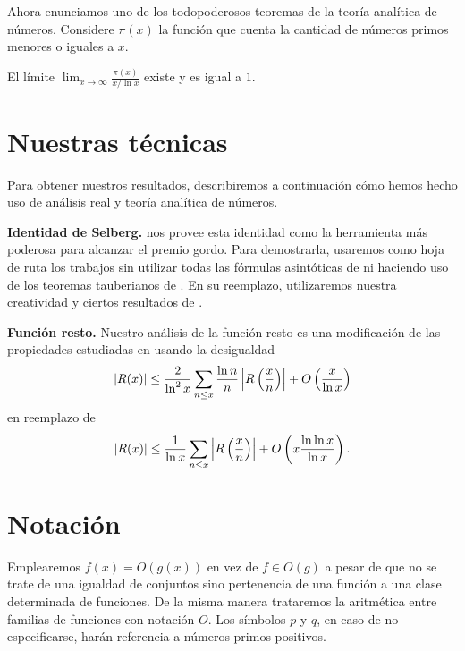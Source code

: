 Ahora enunciamos uno de los todopoderosos teoremas
de la teor\'ia anal\'itica de n\'umeros.
Considere \(\pi(x)\) la funci\'on que cuenta
la cantidad de n\'umeros primos menores o iguales a \(x\).

\begin{theorem}
  El l\'imite
  \(\displaystyle\lim_{x \to \infty} \frac{\pi(x)}{x / \ln x}\)
  existe y es igual a \(1\).
\end{theorem}

\section{Nuestras t\'ecnicas}
Para obtener nuestros resultados,
describiremos a continuaci\'on
c\'omo hemos hecho uso de an\'alisis real y
teor\'ia anal\'itica de n\'umeros.

\textbf{Identidad de Selberg.}
\cite{Selberg1949} nos provee esta identidad como
la herramienta m\'as poderosa para alcanzar el premio gordo.
Para demostrarla, usaremos como hoja de ruta los trabajos
\cite{Diamond1982, Choudhary2017}
sin utilizar todas las f\'ormulas asint\'oticas de \cite{Chebyshev1852}
ni haciendo uso de los teoremas tauberianos de \cite{Shapiro1959}.
En su reemplazo, utilizaremos nuestra creatividad y
ciertos resultados de \cite{Chebyshev1852, Apostol1976, TI1951}.

\textbf{Funci\'on resto.}
Nuestro an\'alisis de la funci\'on resto es una modificaci\'on de
las propiedades estudiadas en \cite{Selberg1949} usando la desigualdad
\[
  \left\lvert R(x) \right\rvert \leq \frac{2}{\ln^2 x}
  \sum_{n \leq x} \frac{\ln n}{n} \left\lvert R \left( \frac{x}{n} \right) \right\rvert
  + O\left( \frac{x}{\ln x} \right)
\]
en reemplazo de
\[
  \left\lvert R(x) \right\rvert \leq \frac{1}{\ln x}
  \sum_{n \leq x} \left\lvert R \left( \frac{x}{n} \right) \right\rvert
  + O\left( x \frac{\ln \ln x}{\ln x} \right).
\]

\section{Notaci\'on}
Emplearemos \(f(x) = O(g(x))\) en vez de \(f \in O(g)\)
a pesar de que no se trate de una igualdad de conjuntos sino
pertenencia de una funci\'on a una clase determinada de funciones.
De la misma manera trataremos la aritm\'etica entre familias de funciones
con notaci\'on \(O\).
Los s\'imbolos \(p\) y \(q\), en caso de no especificarse,
har\'an referencia a n\'umeros primos positivos.

